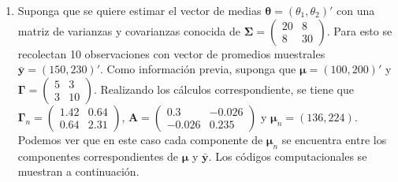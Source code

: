 \documentclass[
  10pt,
  spanish,
]{book}
\providecommand{\tightlist}{%
  \setlength{\itemsep}{0pt}\setlength{\parskip}{0pt}}
\theoremstyle{definition}
\theoremstyle{definition}
\theoremstyle{definition}
\theoremstyle{definition}
\theoremstyle{remark}
\begin{document}
\begin{enumerate}
\def\labelenumi{\arabic{enumi}.}
\tightlist
\item
  Suponga que se quiere estimar el vector de medias \(\boldsymbol \theta=(\theta_1,\theta_2)'\) con una matriz de varianzas y covarianzas conocida de \(\boldsymbol \Sigma=\begin{pmatrix}20&8\\ 8&30\end{pmatrix}\). Para esto se recolectan 10 observaciones con vector de promedios muestrales \(\bar{\mathbf{y}}=(150,230)'\). Como información previa, suponga que \(\boldsymbol \mu=(100, 200)'\) y \(\boldsymbol \Gamma=\begin{pmatrix}5&3\\ 3&10\end{pmatrix}\). Realizando los cálculos correspondiente, se tiene que \(\boldsymbol \Gamma_n=\begin{pmatrix}1.42&0.64\\ 0.64&2.31\end{pmatrix}\), \(\mathbf{A}=\begin{pmatrix}0.3&-0.026\\ -0.026&0.235\end{pmatrix}\) y \(\boldsymbol \mu_n=(136,224)\). Podemos ver que en este caso cada componente de \(\boldsymbol \mu_n\) se encuentra entre los componentes correspondientes de \(\boldsymbol \mu\) y \(\bar{\mathbf{y}}\). Los códigos computacionales se muestran a continuación.
\end{enumerate}
\end{document}
